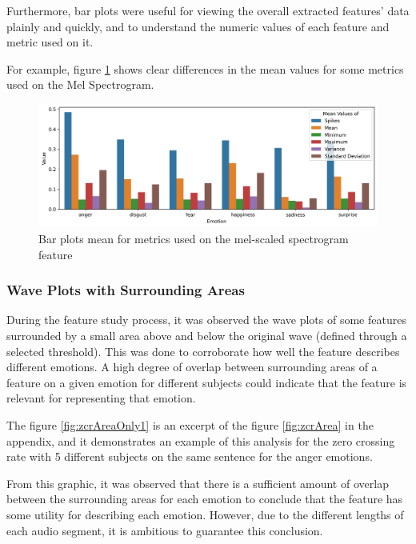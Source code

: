 Furthermore, bar plots were useful for viewing the overall extracted features' data plainly and quickly, and to understand the numeric values of each feature and metric used on it.

For example, figure \ref{fig:melBarPlot} shows clear differences in the mean values for some metrics used on the Mel Spectrogram.

\begin{figure}[H]
	\centering
	\includegraphics[width=\textwidth]{figs/4_1_traditional/meanFeatBarPlot.png}
	\caption{Bar plots mean for metrics used on the mel-scaled spectrogram feature}
	\label{fig:melBarPlot}
\end{figure}


\subsubsection{Wave Plots with Surrounding Areas}

During the feature study process, it was observed the wave plots of some features surrounded by a small area above and below the original wave (defined through a selected threshold). This was done to corroborate how well the feature describes different emotions. A high degree of overlap between surrounding areas of a feature on a given emotion for different subjects could indicate that the feature is relevant for representing that emotion.

The figure \ref{fig:zcrAreaOnly1} is an excerpt of the figure \ref{fig:zcrArea} in the appendix, and it demonstrates an example of this analysis for the zero crossing rate with 5 different subjects on the same sentence for the anger emotions.

From this graphic, it was observed that there is a sufficient amount of overlap between the surrounding areas for each emotion to conclude that the feature has some utility for describing each emotion. However, due to the different lengths of each audio segment, it is ambitious to guarantee this conclusion.

